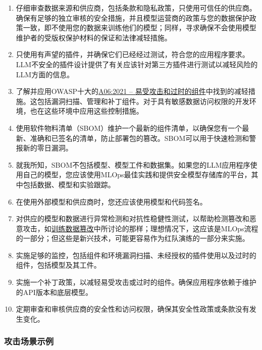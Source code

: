 \documentclass[
]{article}
\providecommand{\tightlist}{%
  \setlength{\itemsep}{0pt}\setlength{\parskip}{0pt}}
\begin{document}
\begin{enumerate}
\def\labelenumi{\arabic{enumi}.}
\tightlist
\item
  仔细审查数据来源和供应商，包括条款和隐私政策，只使用可信任的供应商。确保有足够的独立审核的安全措施，并且模型运营商的政策与您的数据保护政策一致，即不使用您的数据来训练他们的模型；同样，寻求确保不会使用模型维护者的受版权保护材料的保证和法律减轻措施。
\item
  只使用有声望的插件，并确保它们已经经过测试，符合您的应用程序要求。LLM不安全的插件设计提供了有关应该针对第三方插件进行测试以减轻风险的LLM方面的信息。
\item
  了解并应用OWASP十大的\href{https://owasp.org/Top10/A06_2021-Vulnerable_and_Outdated_Components/}{A06:2021
  --
  易受攻击和过时的组件}中找到的减轻措施。这包括漏洞扫描、管理和补丁组件。对于具有敏感数据访问权限的开发环境，也在这些环境中应用这些控制措施。
\item
  使用软件物料清单（SBOM）维护一个最新的组件清单，以确保您有一个最新、准确和已签名的清单，防止部署包的篡改。SBOM可以用于快速检测和警报新的零日漏洞。
\item
  就我所知，SBOM不包括模型、模型工件和数据集。如果您的LLM应用程序使用自己的模型，您应该使用MLOps最佳实践和提供安全模型存储库的平台，其中包括数据、模型和实验跟踪。
\item
  在使用外部模型和供应商时，您还应该使用模型和代码签名。
\item
  对供应的模型和数据进行异常检测和对抗性稳健性测试，以帮助检测篡改和恶意攻击，如\href{https://github.com/OWASP/www-project-top-10-for-large-language-model-applications/blob/main/1_0_vulns/Training_Data_Poisoning.md}{训练数据篡改}中所讨论的那样；理想情况下，这应该是MLOps流程的一部分；但这些是新兴技术，可能更容易作为红队演练的一部分来实施。
\item
  实施足够的监控，包括组件和环境漏洞扫描、未经授权的插件使用以及过时的组件，包括模型及其工件。
\item
  实施一个补丁政策，以减轻易受攻击或过时的组件。确保应用程序依赖于维护的API版本和底层模型。
\item
  定期审查和审核供应商的安全性和访问权限，确保其安全性政策或条款没有发生变化。
\end{enumerate}

\subsubsection{攻击场景示例}\label{ux653bux51fbux573aux666fux793aux4f8b}
\end{document}
